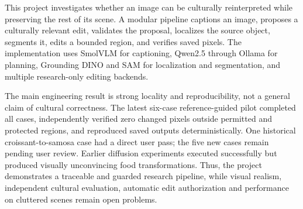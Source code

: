 This project investigates whether an image can be culturally reinterpreted while preserving the rest of its scene. A modular pipeline captions an image, proposes a culturally relevant edit, validates the proposal, localizes the source object, segments it, edits a bounded region, and verifies saved pixels. The implementation uses SmolVLM for captioning, Qwen2.5 through Ollama for planning, Grounding DINO and SAM for localization and segmentation, and multiple research-only editing backends.

The main engineering result is strong locality and reproducibility, not a general claim of cultural correctness. The latest six-case reference-guided pilot completed all cases, independently verified zero changed pixels outside permitted and protected regions, and reproduced saved outputs deterministically. One historical croissant-to-samosa case had a direct user pass; the five new cases remain pending user review. Earlier diffusion experiments executed successfully but produced visually unconvincing food transformations. Thus, the project demonstrates a traceable and guarded research pipeline, while visual realism, independent cultural evaluation, automatic edit authorization and performance on cluttered scenes remain open problems.

